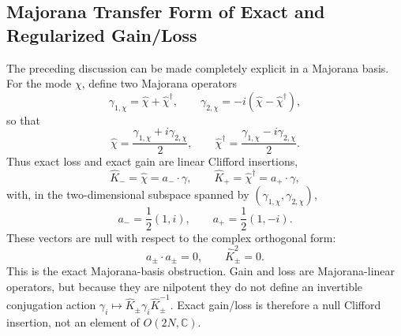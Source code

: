 \documentclass[aps,prb,onecolumn,nofootinbib,superscriptaddress]{revtex4-2}
\theoremstyle{plain}
\theoremstyle{definition}
\begin{document}
\subsection{Majorana Transfer Form of Exact and Regularized Gain/Loss}
\label{sec:majorana-gain-loss-transfer}

The preceding discussion can be made completely explicit in a Majorana basis.
For the mode \(\chi\), define two Majorana operators
\begin{equation}
  \gamma_{1,\chi}=\hat\chi+\hat\chi^\dagger,
  \qquad
  \gamma_{2,\chi}=-i(\hat\chi-\hat\chi^\dagger),
  \label{eq:mode-majoranas}
\end{equation}
so that
\begin{equation}
  \hat\chi=\frac{\gamma_{1,\chi}+i\gamma_{2,\chi}}{2},
  \qquad
  \hat\chi^\dagger=\frac{\gamma_{1,\chi}-i\gamma_{2,\chi}}{2}.
  \label{eq:creation-annihilation-majoranas}
\end{equation}
Thus exact loss and exact gain are linear Clifford insertions,
\begin{equation}
  \hat K_-=\hat\chi=a_-\cdot\gamma,
  \qquad
  \hat K_+=\hat\chi^\dagger=a_+\cdot\gamma,
  \label{eq:exact-gain-loss-majorana-linear}
\end{equation}
with, in the two-dimensional subspace spanned by
\((\gamma_{1,\chi},\gamma_{2,\chi})\),
\begin{equation}
  a_-=\frac{1}{2}(1,i),
  \qquad
  a_+=\frac{1}{2}(1,-i).
  \label{eq:null-majorana-vectors}
\end{equation}
These vectors are null with respect to the complex orthogonal form:
\begin{equation}
  a_\pm\cdot a_\pm=0,
  \qquad
  \hat K_\pm^2=0 .
  \label{eq:exact-gain-loss-null}
\end{equation}
This is the exact Majorana-basis obstruction.  Gain and loss are
Majorana-linear operators, but because they are nilpotent they do not define
an invertible conjugation action
\(\gamma_i\mapsto \hat K_\pm\gamma_i\hat K_\pm^{-1}\).  Exact gain/loss is
therefore a null Clifford insertion, not an element of
\(O(2N,\mathbb C)\).
\end{document}
